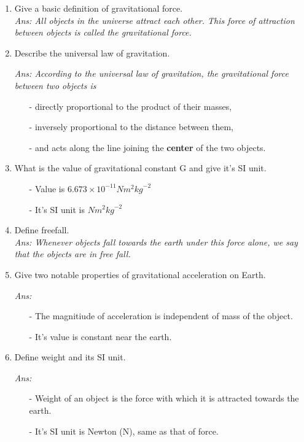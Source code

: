 \documentclass[12pt]{article}
\begin{document}
\begin{enumerate}
	\item Give a basic definition of gravitational force. \\
		{\itshape Ans:
			All objects in the universe attract each other.
			This force of attraction between objects is
			called the gravitational force.
		}
	\item Describe the universal law of gravitation. \\
		{\itshape Ans: According to the universal law of gravitation,
			the gravitational force between two objects is
			\begin{itemize}
				\item[-] directly proportional to the product of their masses,
				\item[-] inversely proportional to the distance between them,
				\item[-] and acts along the line joining the \textbf{center} of the two objects.
			\end{itemize}
		}
	\item What is the value of gravitational constant G and give it's SI unit. \\
		{\itshape
			\begin{itemize}
				\item[-] Value is $6.673 \times 10^{-11} Nm^2{kg}^{-2}$
				\item[-] It's SI unit is $Nm^2{kg}^{-2}$
			\end{itemize}
		}
	\item Define freefall. \\
		{\itshape Ans:
			Whenever objects fall
			towards the earth under this force alone, we
			say that the objects are in free fall.
		}
	\item Give two notable properties of gravitational acceleration on Earth. \\
		{\itshape Ans:
			\begin{itemize}
				\item[-] The magnitiude of acceleration is independent of mass of the object.
				\item[-] It's value is constant near the earth.
			\end{itemize}
		}
	\item Define weight and its SI unit. \\
		{\itshape Ans:
			\begin{itemize}
				\item[-] Weight of an object is the force with which 
					it is attracted towards the earth.
				\item[-] It's SI unit is Newton (N), same as that of force.

\end{itemize}}
\end{enumerate}
\end{document}
